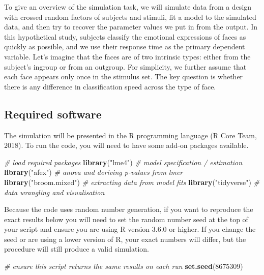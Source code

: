 \documentclass[doc,floatsintext]{apa6}
\newenvironment{Shaded}{\begin{snugshade}}{\end{snugshade}}
\newcommand{\KeywordTok}[1]{\textcolor[rgb]{0.13,0.29,0.53}{\textbf{#1}}}
\newcommand{\DecValTok}[1]{\textcolor[rgb]{0.00,0.00,0.81}{#1}}
\newcommand{\StringTok}[1]{\textcolor[rgb]{0.31,0.60,0.02}{#1}}
\newcommand{\CommentTok}[1]{\textcolor[rgb]{0.56,0.35,0.01}{\textit{#1}}}
\newcommand{\NormalTok}[1]{#1}
\begin{document}
To give an overview of the simulation task, we will simulate data from a
design with crossed random factors of subjects and stimuli, fit a model
to the simulated data, and then try to recover the parameter values we
put in from the output. In this hypothetical study, subjects classify
the emotional expressions of faces as quickly as possible, and we use
their response time as the primary dependent variable. Let's imagine
that the faces are of two intrinsic types: either from the subject's
ingroup or from an outgroup. For simplicity, we further assume that each
face appears only once in the stimulus set. The key question is whether
there is any difference in classification speed across the type of face.

\subsection{Required software}\label{required-software}

The simulation will be presented in the R programming language (R Core
Team, 2018). To run the code, you will need to have some add-on packages
available.

\begin{Shaded}
\begin{Highlighting}[]
\CommentTok{# load required packages}
\KeywordTok{library}\NormalTok{(}\StringTok{"lme4"}\NormalTok{)        }\CommentTok{# model specification / estimation}
\KeywordTok{library}\NormalTok{(}\StringTok{"afex"}\NormalTok{)        }\CommentTok{# anova and deriving p-values from lmer}
\KeywordTok{library}\NormalTok{(}\StringTok{"broom.mixed"}\NormalTok{) }\CommentTok{# extracting data from model fits }
\KeywordTok{library}\NormalTok{(}\StringTok{"tidyverse"}\NormalTok{)   }\CommentTok{# data wrangling and visualisation}
\end{Highlighting}
\end{Shaded}

Because the code uses random number generation, if you want to reproduce
the exact results below you will need to set the random number seed at
the top of your script and ensure you are using R version 3.6.0 or
higher. If you change the seed or are using a lower version of R, your
exact numbers will differ, but the procedure will still produce a valid
simulation.

\begin{Shaded}
\begin{Highlighting}[]
\CommentTok{# ensure this script returns the same results on each run}
\KeywordTok{set.seed}\NormalTok{(}\DecValTok{8675309}\NormalTok{)}
\end{Highlighting}
\end{Shaded}
\end{document}
